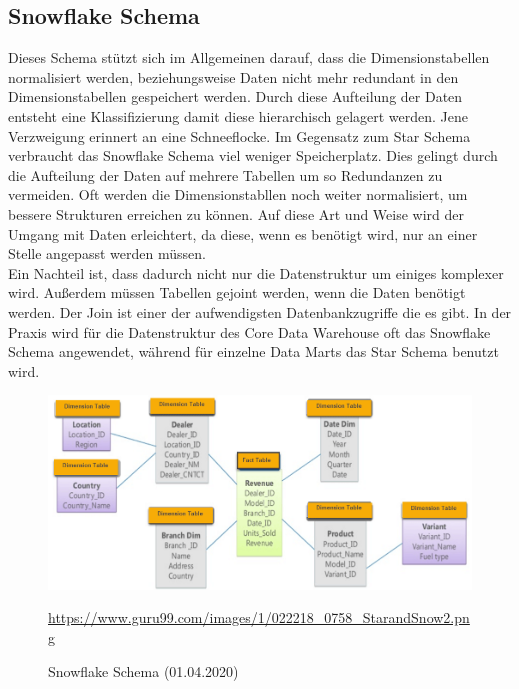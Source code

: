 \subsection{Snowflake Schema}\label{ssec:Snowflake-Schema}
Dieses Schema stützt sich im Allgemeinen darauf, dass die Dimensionstabellen normalisiert werden, beziehungsweise Daten nicht mehr redundant in den Dimensionstabellen gespeichert werden. Durch diese Aufteilung der Daten entsteht eine Klassifizierung damit diese hierarchisch gelagert werden. Jene Verzweigung erinnert an eine Schneeflocke. Im Gegensatz zum Star Schema verbraucht das Snowflake Schema viel weniger Speicherplatz. Dies gelingt durch die Aufteilung der Daten auf mehrere Tabellen um so Redundanzen zu vermeiden. Oft werden die Dimensionstabllen noch weiter normalisiert, um bessere Strukturen erreichen zu können. Auf diese Art und Weise wird der Umgang mit Daten erleichtert, da diese, wenn es benötigt wird, nur an einer Stelle angepasst werden müssen. \\
Ein Nachteil ist, dass dadurch nicht nur die Datenstruktur um einiges komplexer wird. Außerdem müssen Tabellen gejoint werden, wenn die Daten benötigt werden. Der Join ist einer der aufwendigsten Datenbankzugriffe die es gibt. In der Praxis wird für die Datenstruktur des Core Data Warehouse oft das Snowflake Schema angewendet, während für einzelne Data Marts das Star Schema benutzt wird.
\begin{figure}[H]
\centering
  \includegraphics[scale=0.4]{images/Snow.png}
  \caption[Snowflake Schema (01.04.2020)]{Snowflake Schema (01.04.2020)}
  \label{fig:Snowflake-Schema}
  \url{https://www.guru99.com/images/1/022218_0758_StarandSnow2.png}
\end{figure}
\newpage
